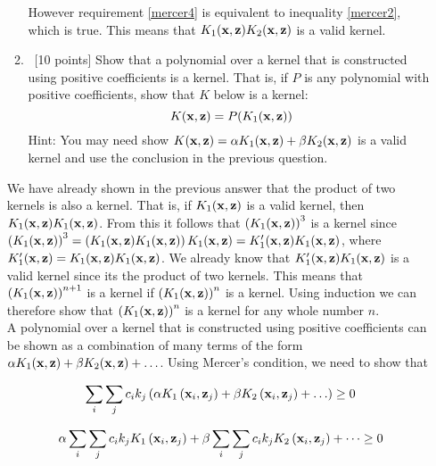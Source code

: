\begin{enumerate}
\begin{enumerate}
  However requirement \ref{mercer4} is equivalent to inequality \ref{mercer2}, which is true. This means that $K_1({\bf x},{\bf z}) K_2({\bf x},{\bf z})$ is a valid kernel.
  
\item ~[10 points] Show that a polynomial over a kernel that is
  constructed using positive coefficients is a kernel. That is, if $P$
  is any polynomial with positive coefficients, show that $K$ below is
  a kernel:
  \begin{equation*}
    K({\bf x},{\bf z}) =P( K_1({\bf x},{\bf z}))
  \end{equation*} 
Hint: You may need show  $ K({\bf x},{\bf z}) = \alpha K_1({\bf x},{\bf z}) +  \beta K_2({\bf x},{\bf z})$ is a valid kernel and use the conclusion in the previous question.
\end{enumerate} 
  
We have already shown in the previous answer that the product of two kernels is also a kernel. That is, if $K_1({\bf x}, {\bf z})$ is a valid kernel, then $K_1({\bf x}, {\bf z})K_1({\bf x}, {\bf z})$. From this it follows that $\left(K_1({\bf x}, {\bf z})\right)^3$ is a kernel since $\left(K_1({\bf x}, {\bf z})\right)^3 = \left( K_1({\bf x}, {\bf z}) K_1({\bf x}, {\bf z})\right) K_1({\bf x}, {\bf z})= K_1'({\bf x}, {\bf z})K_1({\bf x}, {\bf z})$, where 
$K_1'({\bf x}, {\bf z}) =  K_1({\bf x}, {\bf z}) K_1({\bf x}, {\bf z})$. We already know that $K_1'({\bf x}, {\bf z})K_1({\bf x}, {\bf z})$ is a valid kernel since its the product of two kernels. This means that 
$\left(K_1({\bf x}, {\bf z})\right)^{n+1}$ is a kernel if $\left(K_1({\bf x}, {\bf z})\right)^n$ is a kernel. Using induction we can therefore show that $\left(K_1({\bf x}, {\bf z})\right)^n$ is a kernel for any whole number $n$.\\

A polynomial over a kernel that is constructed using positive coefficients can be shown as a combination of many terms of the form $\alpha K_1({\bf x}, {\bf z}) + \beta K_2({\bf x}, {\bf z}) + \ldots$. Using Mercer's condition, we need to show that 

    \begin{equation}
 \sum_i \sum_j c_i k_j \left(\alpha K_1 \left ( {\bf x}_i, {\bf z}_j \right ) +\beta K_2 \left ( {\bf x}_i, {\bf z}_j \right ) + \ldots \right) \geq 0
   \label{mercer5}
  \end{equation} 

    \begin{equation}
\alpha \sum_i \sum_j c_i k_j K_1 \left ( {\bf x}_i, {\bf z}_j \right ) +\beta \sum_i \sum_j c_i k_j K_2 \left ( {\bf x}_i, {\bf z}_j \right ) + \dots  \geq 0
   \label{mercer6}
  \end{equation} 


\end{enumerate}
